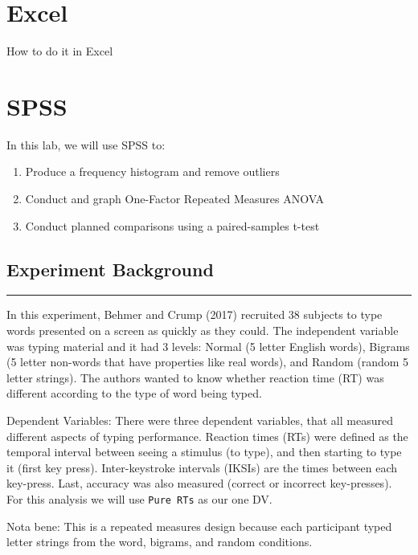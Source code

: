 \documentclass[]{book}
\providecommand{\tightlist}{%
  \setlength{\itemsep}{0pt}\setlength{\parskip}{0pt}}
\begin{document}
\section{Excel}\label{excel-9}

How to do it in Excel

\section{SPSS}\label{spss-9}

In this lab, we will use SPSS to:

\begin{enumerate}
\def\labelenumi{\arabic{enumi}.}
\tightlist
\item
  Produce a frequency histogram and remove outliers
\item
  Conduct and graph One-Factor Repeated Measures ANOVA
\item
  Conduct planned comparisons using a paired-samples t-test
\end{enumerate}

\subsection{Experiment Background}\label{experiment-background-4}

\begin{center}\rule{0.5\linewidth}{0.5pt}\end{center}

In this experiment, Behmer and Crump (2017) recruited 38 subjects to
type words presented on a screen as quickly as they could. The
independent variable was typing material and it had 3 levels: Normal (5
letter English words), Bigrams (5 letter non-words that have properties
like real words), and Random (random 5 letter strings). The authors
wanted to know whether reaction time (RT) was different according to the
type of word being typed.

Dependent Variables: There were three dependent variables, that all
measured different aspects of typing performance. Reaction times (RTs)
were defined as the temporal interval between seeing a stimulus (to
type), and then starting to type it (first key press). Inter-keystroke
intervals (IKSIs) are the times between each key-press. Last, accuracy
was also measured (correct or incorrect key-presses). For this analysis
we will use \texttt{Pure\ RTs} as our one DV.

Nota bene: This is a repeated measures design because each participant
typed letter strings from the word, bigrams, and random conditions.
\end{document}
